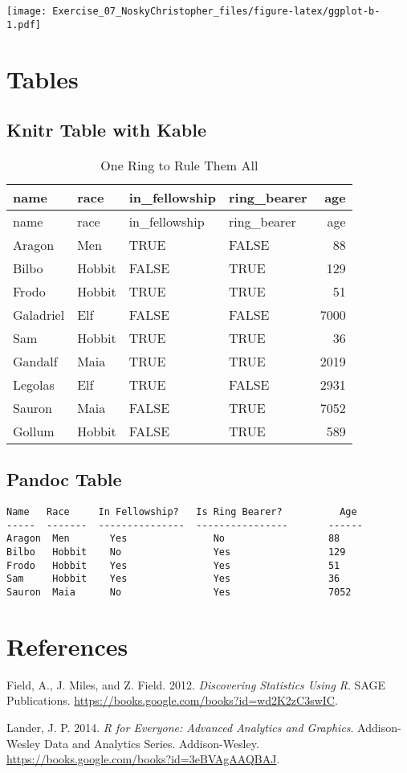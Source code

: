 \documentclass[
]{article}
\begin{document}
\texttt{[image: Exercise\_07\_NoskyChristopher\_files/figure-latex/ggplot-b-1.pdf]}

\hypertarget{tables}{%
\section{Tables}\label{tables}}

\hypertarget{knitr-table-with-kable}{%
\subsection{Knitr Table with Kable}\label{knitr-table-with-kable}}

\begin{longtable}[]{@{}llllr@{}}
\caption{One Ring to Rule Them All}\tabularnewline
\toprule
name & race & in\_fellowship & ring\_bearer & age\tabularnewline
\midrule
\endfirsthead
\toprule
name & race & in\_fellowship & ring\_bearer & age\tabularnewline
\midrule
\endhead
Aragon & Men & TRUE & FALSE & 88\tabularnewline
Bilbo & Hobbit & FALSE & TRUE & 129\tabularnewline
Frodo & Hobbit & TRUE & TRUE & 51\tabularnewline
Galadriel & Elf & FALSE & FALSE & 7000\tabularnewline
Sam & Hobbit & TRUE & TRUE & 36\tabularnewline
Gandalf & Maia & TRUE & TRUE & 2019\tabularnewline
Legolas & Elf & TRUE & FALSE & 2931\tabularnewline
Sauron & Maia & FALSE & TRUE & 7052\tabularnewline
Gollum & Hobbit & FALSE & TRUE & 589\tabularnewline
\bottomrule
\end{longtable}

\hypertarget{pandoc-table}{%
\subsection{Pandoc Table}\label{pandoc-table}}

\begin{verbatim}
Name   Race     In Fellowship?   Is Ring Bearer?          Age  
-----  -------  ---------------  ----------------       ------
Aragon  Men       Yes               No                  88
Bilbo   Hobbit    No                Yes                 129
Frodo   Hobbit    Yes               Yes                 51
Sam     Hobbit    Yes               Yes                 36
Sauron  Maia      No                Yes                 7052
\end{verbatim}

\hypertarget{references}{%
\section*{References}\label{references}}

\hypertarget{refs}{}
\leavevmode\hypertarget{ref-field2012discovering}{}%
Field, A., J. Miles, and Z. Field. 2012. \emph{Discovering Statistics
Using R}. SAGE Publications.
\url{https://books.google.com/books?id=wd2K2zC3swIC}.

\leavevmode\hypertarget{ref-lander2014r}{}%
Lander, J. P. 2014. \emph{R for Everyone: Advanced Analytics and
Graphics}. Addison-Wesley Data and Analytics Series. Addison-Wesley.
\url{https://books.google.com/books?id=3eBVAgAAQBAJ}.
\end{document}
